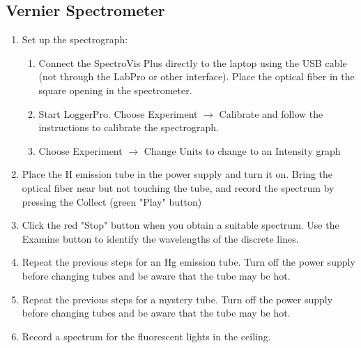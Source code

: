 \subsection{Vernier Spectrometer}

\begin{enumerate}
\item Set up the spectrograph:
\begin{enumerate}
\item Connect the SpectroVis Plus directly to the laptop using the USB cable (not through the LabPro or other interface).   Place the optical fiber in the square opening in the spectrometer.  
\item Start LoggerPro.  Choose Experiment $\rightarrow$ Calibrate and follow the instructions to calibrate the spectrograph.
\item Choose Experiment $\rightarrow$ Change Units to change to an Intensity graph
\end{enumerate}
\item Place the H emission tube in the power supply and turn it on.  Bring the optical fiber near but not touching the tube, and record the spectrum by pressing the Collect (green "Play" button)
\item Click the red "Stop" button when you obtain a suitable spectrum.  Use the Examine button to identify the wavelengths of the discrete lines.
\item Repeat the previous steps for an Hg emission tube.  Turn off the power supply before changing tubes and be aware that the tube may be hot.
\item Repeat the previous steps for a mystery tube.  Turn off the power supply before changing tubes and be aware that the tube may be hot.
\item Record a spectrum for the fluorescent lights in the ceiling.   
\end{enumerate}

